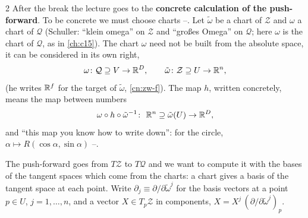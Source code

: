 \begin{paracol}{2}
After the break the lecture goes to the \textbf{concrete calculation of the push-forward}. To be concrete we must choose charts --. Let $\tilde\omega$ be a chart of $\mathcal Z$ and $\omega$ a chart of $\mathcal Q$ (Schuller: ``klein omega'' on $\mathcal Z$ and ``gro{\ss}es Omega'' on $\mathcal Q$; here $\omega$ is the chart of $\mathcal Q$, as in \cref{ch:c15}). The chart $\omega$ need not be built from the absolute space, it can be considered in its own right,
\[
  \omega\colon\mathcal Q\supseteq V\to\mathbb{R}^{D},\qquad\tilde\omega\colon\mathcal Z\supseteq U\to\mathbb{R}^{n},
\]
(he writes $\mathbb{R}^{f}$ for the target of $\tilde\omega$, \cref{cn:zw-f}). The map $h$, written concretely, means the map between numbers
\begin{equation}\label{eq:zw-hchart}
  \omega\circ h\circ\tilde\omega^{-1}\colon\ \R^{n}\supseteq\tilde\omega(U)\to\R^{D},
\end{equation}
and ``this map you know how to write down'': for the circle, $\alpha\mapsto R(\cos\alpha,\sin\alpha)$ --.

The push-forward goes from $T\mathcal Z$ to $T\mathcal Q$ and we want to compute it with the bases of the tangent spaces which come from the charts: a chart gives a basis of the tangent space at each point. Write $\partial_j\equiv\partial/\partial\tilde\omega^j$ for the basis vectors at a point $p\in U$, $j=1,\dots,n$, and a vector $X\in T_p\mathcal Z$ in components, $X=X^j\,(\partial/\partial\tilde\omega^j)_p$.


\end{paracol}
